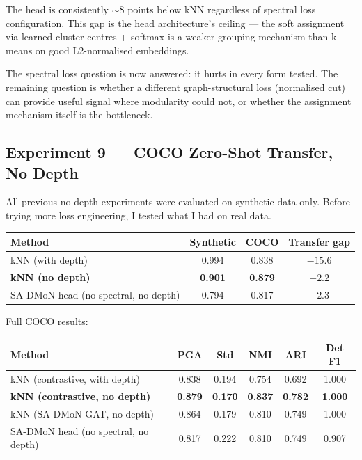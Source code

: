 The head is consistently $\sim$8 points below kNN regardless of spectral loss configuration. This gap is the head architecture's ceiling --- the soft assignment via learned cluster centres + softmax is a weaker grouping mechanism than k-means on good L2-normalised embeddings.

The spectral loss question is now answered: it hurts in every form tested. The remaining question is whether a different graph-structural loss (normalised cut) can provide useful signal where modularity could not, or whether the assignment mechanism itself is the bottleneck.


\subsection{Experiment 9 --- COCO Zero-Shot Transfer, No Depth}

All previous no-depth experiments were evaluated on synthetic data only. Before trying more loss engineering, I tested what I had on real data.

\begin{center}
\begin{tabular}{lccc}
\toprule
Method & Synthetic & COCO & Transfer gap \\
\midrule
kNN (with depth) & 0.994 & 0.838 & $-15.6$ \\
\textbf{kNN (no depth)} & \textbf{0.901} & \textbf{0.879} & \textbf{$-2.2$} \\
SA-DMoN head (no spectral, no depth) & 0.794 & 0.817 & $+2.3$ \\
\bottomrule
\end{tabular}
\end{center}

Full COCO results:

\begin{center}
\begin{tabular}{lccccc}
\toprule
Method & PGA & Std & NMI & ARI & Det F1 \\
\midrule
kNN (contrastive, with depth) & 0.838 & 0.194 & 0.754 & 0.692 & 1.000 \\
\textbf{kNN (contrastive, no depth)} & \textbf{0.879} & \textbf{0.170} & \textbf{0.837} & \textbf{0.782} & \textbf{1.000} \\
kNN (SA-DMoN GAT, no depth) & 0.864 & 0.179 & 0.810 & 0.749 & 1.000 \\
SA-DMoN head (no spectral, no depth) & 0.817 & 0.222 & 0.810 & 0.749 & 0.907 \\
\bottomrule
\end{tabular}
\end{center}

